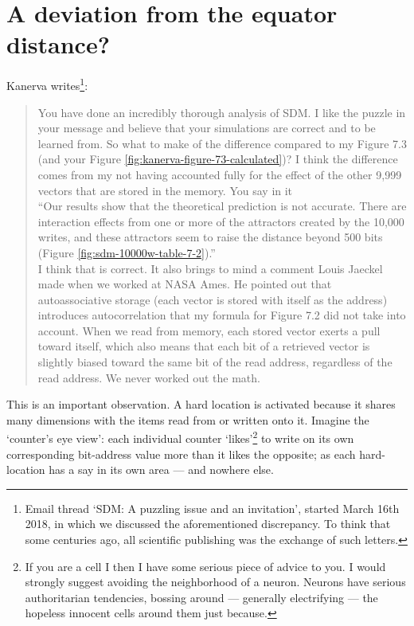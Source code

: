 
\section{A deviation from the equator distance?}

Kanerva writes\footnote{Email thread `SDM: A puzzling issue and an invitation', started March 16th 2018, in which we discussed the aforementioned discrepancy.  To think that some centuries ago, all scientific publishing was the exchange of such letters.}:

\begin{quote}
    You have done an incredibly thorough analysis of SDM. I like the puzzle in your message and believe that your simulations are correct and to be learned from.  So what to make of the difference compared to my Figure 7.3 (and your Figure \ref{fig:kanerva-figure-73-calculated})?  I think the difference comes from my not having accounted fully for the effect of the other 9,999 vectors that are stored in the memory.  You say in it\\

   ``Our results show that the theoretical prediction is not accurate. There are interaction effects from one or more of the attractors created by the 10,000 writes, and these attractors seem to raise the distance beyond 500 bits (Figure \ref{fig:sdm-10000w-table-7-2}).'' \\

   I think that is correct.  It also brings to mind a comment Louis Jaeckel made when we worked at NASA Ames.  He pointed out that autoassociative storage (each vector is stored with itself as the address) introduces autocorrelation that my formula for Figure 7.2 did not take into account.  When we read from memory, each stored vector exerts a pull toward itself, which also means that each bit of a retrieved vector is slightly biased toward the same bit of the read address, regardless of the read address.  We never worked out the math.
\end{quote}

This is an important observation. A hard location is activated because it shares many dimensions with the items read from or written onto it. Imagine the `counter's eye view':  each individual counter `likes'\footnote{If you are a cell I then I have some serious piece of advice to you.  I would strongly suggest avoiding the neighborhood of a neuron. Neurons have serious authoritarian tendencies, bossing around --- generally electrifying --- the hopeless innocent cells around them just because.} to write on its own corresponding bit-address value more than it likes the opposite; as each hard-location has a say in its own area --- and nowhere else.

